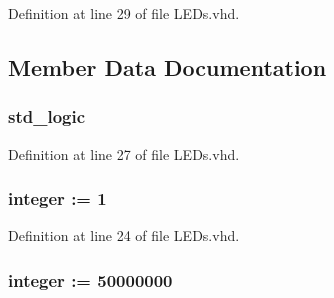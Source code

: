 Definition at line 29 of file L\+E\+Ds.\+vhd.



\subsection{Member Data Documentation}
\hypertarget{class_l_e_ds_1_1_l_e_ds_a15ab33796b0132ed52d27866826e80ef}{}
\subsubsection[{blink}]{ {\bfseries \textcolor{comment}{std\+\_\+logic}\textcolor{vhdlchar}{ }} \hspace{0.3cm}{\ttfamily [Signal]}}\label{class_l_e_ds_1_1_l_e_ds_a15ab33796b0132ed52d27866826e80ef}


Definition at line 27 of file L\+E\+Ds.\+vhd.

\hypertarget{class_l_e_ds_1_1_l_e_ds_a1890617960a841a3d027f78733169e15}{}
\subsubsection[{B\+L\+I\+N\+K\+\_\+\+F\+R\+E\+Q}]{ {\bfseries \textcolor{comment}{integer}\textcolor{vhdlchar}{ }\textcolor{vhdlchar}{ }\textcolor{vhdlchar}{\+:}\textcolor{vhdlchar}{=}\textcolor{vhdlchar}{ }\textcolor{vhdlchar}{ } \textcolor{vhdldigit}{1} \textcolor{vhdlchar}{ }} \hspace{0.3cm}{\ttfamily [Constant]}}\label{class_l_e_ds_1_1_l_e_ds_a1890617960a841a3d027f78733169e15}


Definition at line 24 of file L\+E\+Ds.\+vhd.

\hypertarget{class_l_e_ds_1_1_l_e_ds_aa45ed8f4ade73b3c1510f9df8ec7dd9c}{}
\subsubsection[{C\+L\+K\+\_\+\+F\+R\+E\+Q}]{ {\bfseries \textcolor{comment}{integer}\textcolor{vhdlchar}{ }\textcolor{vhdlchar}{ }\textcolor{vhdlchar}{\+:}\textcolor{vhdlchar}{=}\textcolor{vhdlchar}{ }\textcolor{vhdlchar}{ } \textcolor{vhdldigit}{50000000} \textcolor{vhdlchar}{ }} \hspace{0.3cm}{\ttfamily [Constant]}}\label{class_l_e_ds_1_1_l_e_ds_aa45ed8f4ade73b3c1510f9df8ec7dd9c}


